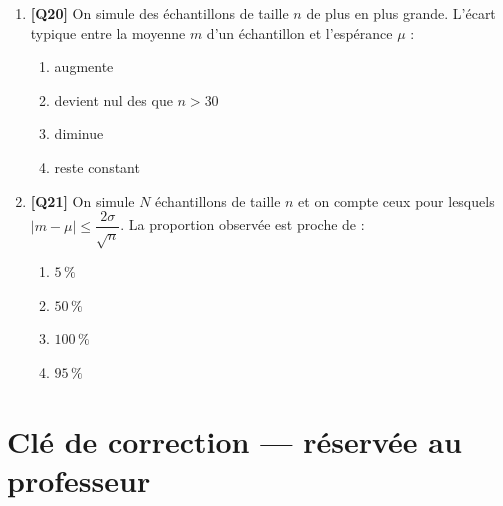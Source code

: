 \begin{enumerate}
\item \textbf{[Q20]} On simule des échantillons de taille $n$ de plus en plus grande. L'écart typique entre la moyenne $m$ d'un échantillon et l'espérance $\mu$ :
  \begin{enumerate}[label=\Alph*.]
    \item augmente
    \item devient nul des que $n>30$
    \item diminue
    \item reste constant
  \end{enumerate}

\item \textbf{[Q21]} On simule $N$ échantillons de taille $n$ et on compte ceux pour lesquels $|m-\mu|\leq \dfrac{2\sigma}{\sqrt{n}}$. La proportion observée est proche de :
  \begin{enumerate}[label=\Alph*.]
    \item $5\,\%$
    \item $50\,\%$
    \item $100\,\%$
    \item $95\,\%$
  \end{enumerate}

\end{enumerate}

\ifnxVersionProfesseur
\clearpage
\section*{Clé de correction — réservée au professeur}

